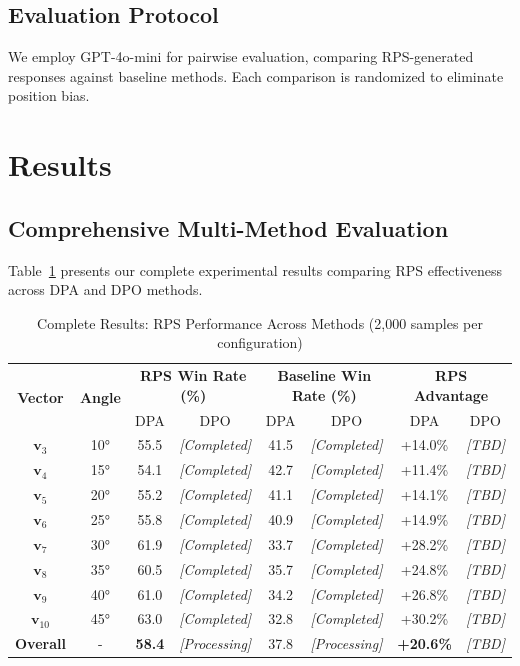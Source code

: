 \documentclass{article} %
\begin{document}
\subsection{Evaluation Protocol}
We employ GPT-4o-mini for pairwise evaluation, comparing RPS-generated responses against baseline methods. Each comparison is randomized to eliminate position bias.

\section{Results}

\subsection{Comprehensive Multi-Method Evaluation}

Table~\ref{tab:comprehensive_results} presents our complete experimental results comparing RPS effectiveness across DPA and DPO methods.

\begin{table}[t]
\centering
\caption{Complete Results: RPS Performance Across Methods (2,000 samples per configuration)}
\label{tab:comprehensive_results}
\begin{tabular}{c|c|cc|cc|cc}
\toprule
\multirow{2}{*}{\textbf{Vector}} & \multirow{2}{*}{\textbf{Angle}} & \multicolumn{2}{c|}{\textbf{RPS Win Rate (\%)}} & \multicolumn{2}{c|}{\textbf{Baseline Win Rate (\%)}} & \multicolumn{2}{c}{\textbf{RPS Advantage}} \\
& & DPA & DPO & DPA & DPO & DPA & DPO \\
\midrule
$\mathbf{v}_3$ & 10° & 55.5 & \textit{[Completed]} & 41.5 & \textit{[Completed]} & +14.0\% & \textit{[TBD]} \\
$\mathbf{v}_4$ & 15° & 54.1 & \textit{[Completed]} & 42.7 & \textit{[Completed]} & +11.4\% & \textit{[TBD]} \\
$\mathbf{v}_5$ & 20° & 55.2 & \textit{[Completed]} & 41.1 & \textit{[Completed]} & +14.1\% & \textit{[TBD]} \\
$\mathbf{v}_6$ & 25° & 55.8 & \textit{[Completed]} & 40.9 & \textit{[Completed]} & +14.9\% & \textit{[TBD]} \\
$\mathbf{v}_7$ & 30° & 61.9 & \textit{[Completed]} & 33.7 & \textit{[Completed]} & +28.2\% & \textit{[TBD]} \\
$\mathbf{v}_8$ & 35° & 60.5 & \textit{[Completed]} & 35.7 & \textit{[Completed]} & +24.8\% & \textit{[TBD]} \\
$\mathbf{v}_9$ & 40° & 61.0 & \textit{[Completed]} & 34.2 & \textit{[Completed]} & +26.8\% & \textit{[TBD]} \\
$\mathbf{v}_{10}$ & 45° & 63.0 & \textit{[Completed]} & 32.8 & \textit{[Completed]} & +30.2\% & \textit{[TBD]} \\
\midrule
\textbf{Overall} & - & \textbf{58.4} & \textit{[Processing]} & 37.8 & \textit{[Processing]} & \textbf{+20.6\%} & \textit{[TBD]} \\
\bottomrule
\end{tabular}
\end{table}
\end{document}
